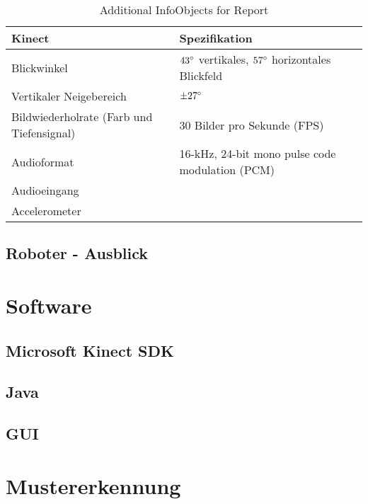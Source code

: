 \begin{table} [H] \scriptsize
\begin{center}
\caption{Additional  InfoObjects for Report}
\label{tab:Additional Content InfoObjects for Report}
\begin{tabular}{|l|l|}
\hline
\textbf{Kinect} & \textbf{Spezifikation} \\
\hline
Blickwinkel & $43\degree$ vertikales, $57\degree$ horizontales Blickfeld \\
\hline
Vertikaler Neigebereich & $\pm 27\degree$ \\
\hline
Bildwiederholrate (Farb und Tiefensignal) & 30 Bilder pro Sekunde (FPS) \\
\hline
Audioformat & 16-kHz, 24-bit mono pulse code modulation (PCM)\\
\hline
Audioeingang & \\
\hline
Accelerometer & \\
\hline
\end{tabular}
\end{center}
\end{table}

\subsection {Roboter - Ausblick}
\section{Software}

\subsection{Microsoft Kinect SDK}
\subsection{Java}

\subsection{GUI}

\section{Mustererkennung}
